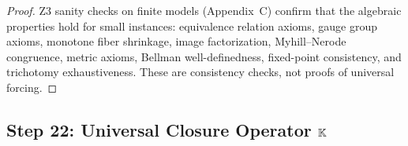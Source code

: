 \begin{proof}
Z3 sanity checks on finite models (Appendix~C) confirm that the
algebraic properties hold for small instances: equivalence relation
axioms, gauge group axioms, monotone fiber shrinkage, image factorization,
Myhill--Nerode congruence, metric axioms, Bellman well-definedness,
fixed-point consistency, and trichotomy exhaustiveness.  These are
consistency checks, not proofs of universal forcing.

\end{proof}


\subsection{Step 22: Universal Closure Operator $\mathbb{K}$}\label{app:step22}

